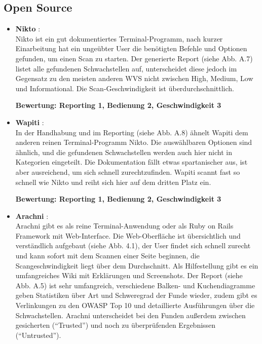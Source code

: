 \documentclass[12pt,oneside,a4paper,parskip,pointlessnumbers]{scrbook}
\begin{document}
    \subsection{Open Source}
    \vspace{20pt}
    \begin{itemize}
      \item \textbf{Nikto} \cite{Nikto}:\\
      Nikto ist ein gut dokumentiertes Terminal-Programm, nach kurzer Einarbeitung hat ein ungeübter User die benötigten Befehle und Optionen gefunden, um einen Scan zu starten.
      Der generierte Report (siehe Abb. A.7) listet alle gefundenen Schwachstellen auf, unterscheidet diese jedoch im Gegensatz zu den meisten anderen WVS nicht zwischen High, Medium, Low und Informational. Die Scan-Geschwindigkeit ist überdurchschnittlich.

      \textbf{Bewertung: Reporting 1, Bedienung 2, Geschwindigkeit 3}
      \vspace{20pt}

      \item \textbf{Wapiti} \cite{Wapiti}:\\
        In der Handhabung und im Reporting (siehe Abb. A.8) ähnelt Wapiti dem anderen reinen Terminal-Programm Nikto. Die auswählbaren Optionen sind ähnlich, und die gefundenen Schwachstellen werden auch hier nicht in Kategorien eingeteilt. Die Dokumentation fällt etwas spartanischer aus, ist aber ausreichend, um sich schnell zurechtzufinden. Wapiti scannt fast so schnell wie Nikto und reiht sich hier auf dem dritten Platz ein.

    \textbf{Bewertung: Reporting 1, Bedienung 2, Geschwindigkeit 3}

\newpage
          \item \textbf{Arachni} \cite{Arachni}:\\
            Arachni gibt es als reine Terminal-Anwendung oder als Ruby on Rails Framework mit Web-Interface. Die Web-Oberfläche ist übersichtlich und verständlich aufgebaut (siehe Abb. 4.1), der User findet sich schnell zurecht und kann sofort mit dem Scannen einer Seite beginnen, die Scangeschwindigkeit liegt über dem Durchschnitt. Als Hilfestellung gibt es ein umfangreiches Wiki mit Erklärungen und Screenshots. Der Report (siehe Abb. A.5) ist sehr umfangreich, verschiedene Balken- und Kuchendiagramme geben Statistiken über Art und Schweregrad der Funde wieder, zudem gibt es Verlinkungen zu den OWASP Top 10 und detaillierte Ausführungen über die Schwachstellen. Arachni unterscheidet bei den Funden außerdem zwischen gesicherten (``Trusted'') und noch zu überprüfenden Ergebnissen (``Untrusted'').


\end{itemize}
\end{document}
